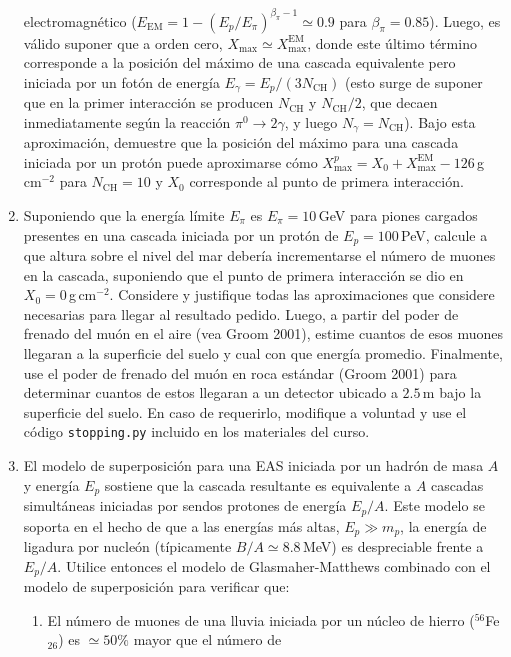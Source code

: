 \documentclass[11pt]{article}
\begin{document}
\begin{enumerate}
		electromagnético ($E_{\mathrm{EM}} = 1 - (E_p/E_\pi)^{\beta_\pi - 1}
		\simeq 0.9$ para $\beta_\pi=0.85$). Luego, es válido suponer que a
		orden cero, $X_{\max} \simeq X_{\max}^{\mathrm{EM}}$, donde este último
		término corresponde a la posición del máximo de una cascada equivalente
		pero iniciada por un fotón de energía $E_\gamma=E_p / (3
		N_{\mathrm{CH}})$ (esto surge de suponer que en la primer interacción
		se producen $N_{\mathrm{CH}}$ y $N_{\mathrm{CH}}/2$, que decaen
		inmediatamente según la reacción $\pi^0 \to 2\gamma$, y luego
		$N_\gamma=N_{\mathrm{CH}}$). Bajo esta aproximación, demuestre que la
		posición del máximo para una cascada iniciada por un protón puede
		aproximarse cómo $X_{\max}^p = X_0 + X_{\max}^{\mathrm{EM}} -
		126$\,g\,cm$^{-2}$ para $N_{\mathrm{CH}}=10$ y $X_0$ corresponde al
		punto de primera interacción.
	\item Suponiendo que la energía límite $E_\pi$ es $E_\pi=10$\,GeV para
		piones cargados presentes en una cascada iniciada por un protón de
		$E_p=100$\,PeV, calcule a que altura sobre el nivel del mar debería
		incrementarse el número de muones en la cascada, suponiendo que el
		punto de primera interacción se dio en $X_0=0$\,g\,cm$^{-2}$. Considere
		y justifique todas las aproximaciones que considere necesarias para
		llegar al resultado pedido. Luego, a partir del poder de frenado del
		muón en el aire (vea Groom 2001), estime cuantos de esos muones
		llegaran a la superficie del suelo y cual con que energía promedio.
		Finalmente, use el poder de frenado del muón en roca estándar (Groom
		2001) para determinar cuantos de estos llegaran a un detector ubicado a
		$2.5$\,m bajo la superficie del suelo. En caso de requerirlo, modifique
		a voluntad y use el código {\texttt{stopping.py}} incluido en los
		materiales del curso. 
	\item El modelo de superposición para una EAS iniciada por un hadrón de
		masa $A$ y energía $E_p$ sostiene que la cascada resultante es
		equivalente a $A$ cascadas simultáneas iniciadas por sendos protones de
		energía $E_p/A$.  Este modelo se soporta en el hecho de que a las
		energías más altas, $E_p \gg m_p$, la energía de ligadura por nucleón
		(típicamente $B/A\simeq 8.8$\,MeV) es despreciable frente a $E_p/A$.
		Utilice entonces el modelo de Glasmaher-Matthews combinado con el
		modelo de superposición para verificar que:
		\begin{enumerate}
			\item El número de muones de una lluvia iniciada por un núcleo de
				hierro ($^{56}$Fe$_{26}$) es $\simeq 50\%$ mayor que el número de

\end{enumerate}
\end{enumerate}
\end{document}
